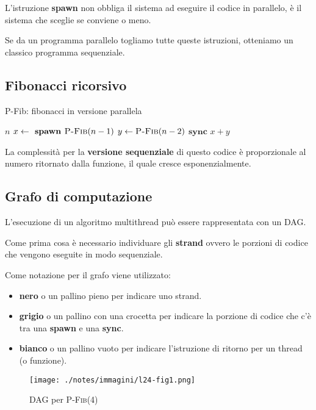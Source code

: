 L'istruzione \textbf{spawn} non obbliga il sistema ad eseguire il codice in parallelo, è il sistema che sceglie se conviene o meno.

Se da un programma parallelo togliamo tutte queste istruzioni, otteniamo un classico programma sequenziale.

\subsection{Fibonacci ricorsivo}\label{fibonacci-ricorsivo}

\begin{breakablealgorithm}
\caption{P-Fib: fibonacci in versione parallela}
\begin{algorithmic}[1]
    \State \Return $n$
\EndIf
\State $x \gets \textbf{ spawn } \textsc{P-Fib}(n-1)$ 
\State $y \gets \textsc{P-Fib}(n-2)$
\State $\textbf{sync}$
\State \Return $ x + y$
\EndFunction
\end{algorithmic}
\end{breakablealgorithm}

La complessità per la \textbf{versione sequenziale} di questo codice è proporzionale al numero ritornato dalla funzione, il quale cresce esponenzialmente.

\subsection{Grafo di computazione}\label{grafo-di-computazione}

L'esecuzione di un algoritmo multithread può essere rappresentata con un DAG.

Come prima cosa è necessario individuare gli \textbf{strand} ovvero le porzioni di codice che vengono eseguite in modo sequenziale.

Come notazione per il grafo viene utilizzato:

\begin{itemize}
\item
  \textbf{nero} o un pallino pieno per indicare uno strand.
\item
  \textbf{grigio} o un pallino con una crocetta per indicare la porzione di codice che c'è tra una \textbf{spawn} e una \textbf{sync}.
\item
  \textbf{bianco} o un pallino vuoto per indicare l'istruzione di
  ritorno per un thread (o funzione).
\end{itemize}

\begin{figure}[htbp]
\centering
\texttt{[image: ./notes/immagini/l24-fig1.png]}
\caption{DAG per \textsc{P-Fib}(4)}
\end{figure}

